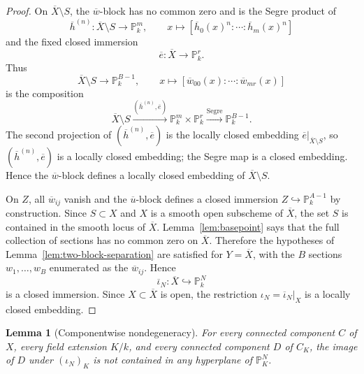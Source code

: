 \documentclass{lms}
\newtheorem{lemma}[theorem]{Lemma}
\newcommand{\PP}{\mathbb P}
\newcommand{\barX}{\overline{X}}
\begin{document}
\begin{proof}
On $\barX\setminus S$, the $\overline w$-block has no common zero and is the Segre product of
\[
        \overline h^{(n)}:\barX\setminus S\longrightarrow\PP^m_k,
        \qquad
        x\longmapsto[\overline h_0(x)^n:\cdots:\overline h_m(x)^n]
\]
and the fixed closed immersion
\[
        \overline e:\barX\longrightarrow\PP^r_k.
\]
Thus
\[
        \barX\setminus S\longrightarrow\PP^{B-1}_k,
        \qquad
        x\longmapsto[\overline w_{00}(x):\cdots:\overline w_{mr}(x)]
\]
is the composition
\[
        \barX\setminus S\xrightarrow{(\overline h^{(n)},\overline e)}\PP^m_k\times\PP^r_k
        \xrightarrow{\operatorname{Segre}}\PP^{B-1}_k.
\]
The second projection of $(\overline h^{(n)},\overline e)$ is the locally closed embedding $\overline e|_{\barX\setminus S}$, so $(\overline h^{(n)},\overline e)$ is a locally closed embedding; the Segre map is a closed embedding.  Hence the $\overline w$-block defines a locally closed embedding of $\barX\setminus S$.

On $Z$, all $\overline w_{ij}$ vanish and the $\overline u$-block defines a closed immersion $Z\hookrightarrow\PP^{A-1}_k$ by construction.  Since $S\subset X$ and $X$ is a smooth open subscheme of $\barX$, the set $S$ is contained in the smooth locus of $\barX$.  Lemma~\ref{lem:basepoint} says that the full collection of sections has no common zero on $\barX$.  Therefore the hypotheses of Lemma~\ref{lem:two-block-separation} are satisfied for $Y=\barX$, with the $B$ sections $w_1,\ldots,w_B$ enumerated as the $\overline w_{ij}$.  Hence
\[
        \overline\iota_N:\barX\hookrightarrow\PP^N_k
\]
is a closed immersion.  Since $X\subset\barX$ is open, the restriction $\iota_N=\overline\iota_N|_X$ is a locally closed embedding.
\end{proof}

\begin{lemma}[Componentwise nondegeneracy]\label{lem:nondegenerate}
For every connected component $C$ of $X$, every field extension $K/k$, and every connected component $D$ of $C_K$, the image of $D$ under $(\iota_N)_K$ is not contained in any hyperplane of $\PP^N_K$.
\end{lemma}
\end{document}
